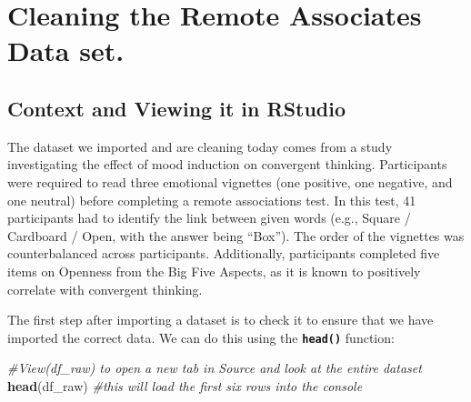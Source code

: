 \documentclass[
]{book}
\newenvironment{Shaded}{\begin{snugshade}}{\end{snugshade}}
\newcommand{\CommentTok}[1]{\textcolor[rgb]{0.56,0.35,0.01}{\textit{#1}}}
\newcommand{\FunctionTok}[1]{\textcolor[rgb]{0.13,0.29,0.53}{\textbf{#1}}}
\newcommand{\NormalTok}[1]{#1}
\begin{document}
\hypertarget{cleaning-the-remote-associates-data-set.}{%
\section{Cleaning the Remote Associates Data set.}\label{cleaning-the-remote-associates-data-set.}}

\hypertarget{context-and-viewing-it-in-rstudio}{%
\subsection{Context and Viewing it in RStudio}\label{context-and-viewing-it-in-rstudio}}

The dataset we imported and are cleaning today comes from a study investigating the effect of mood induction on convergent thinking. Participants were required to read three emotional vignettes (one positive, one negative, and one neutral) before completing a remote associations test. In this test, 41 participants had to identify the link between given words (e.g., Square / Cardboard / Open, with the answer being ``Box''). The order of the vignettes was counterbalanced across participants. Additionally, participants completed five items on Openness from the Big Five Aspects, as it is known to positively correlate with convergent thinking.

The first step after importing a dataset is to check it to ensure that we have imported the correct data. We can do this using the \textbf{\texttt{head()}} function:

\begin{Shaded}
\begin{Highlighting}[]
\CommentTok{\#View(df\_raw) to open a new tab in Source and look at the entire dataset}
\FunctionTok{head}\NormalTok{(df\_raw) }\CommentTok{\#this will load the first six rows into the console}
\end{Highlighting}
\end{Shaded}
\end{document}
